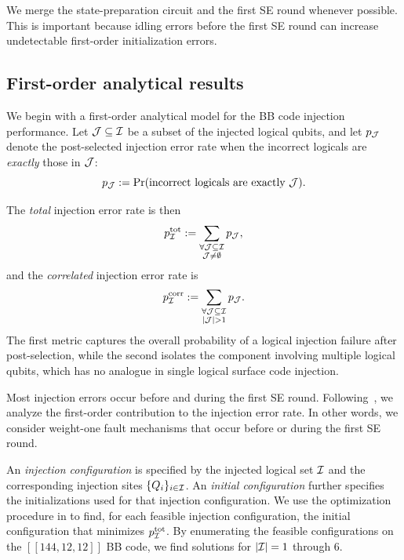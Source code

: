 We merge the state-preparation circuit and the first SE round whenever possible. This is important because idling errors before the first SE round can increase undetectable first-order initialization errors.
    

\subsection{First-order analytical results}
\label{sec:first-order}

We begin with a first-order analytical model for the BB code injection performance. Let $\mathcal{J} \subseteq \mathcal{I}$ be a subset of the injected logical qubits, and let $p_{\mathcal{J}}$ denote the post-selected injection error rate when the incorrect logicals are \emph{exactly} those in $\mathcal{J}$:
\begin{equation}
p_{\mathcal{J}} := \Pr(\text{incorrect logicals are exactly } \mathcal{J}).
\label{eq:p-cJ}
\end{equation}

The \emph{total} injection error rate is then
\begin{equation}
    p_{\mathcal{I}}^{\rm tot} := \sum_{\substack{\forall \mathcal{J} \subseteq \mathcal{I} \\ \mathcal{J} \neq \emptyset}} p_{\mathcal{J}},
    \label{eq:p-cI}
\end{equation}
and the \emph{correlated} injection error rate is
\begin{equation}
    p^{\text{corr}}_{\mathcal{I}} := \sum_{\substack{\forall \mathcal{J} \subseteq \mathcal{I} \\ |\mathcal{J}| > 1}} p_{\mathcal{J}}.
    \label{eq:p-corr-cI}
\end{equation}
The first metric captures the overall probability of a logical injection failure after post-selection, while the second isolates the component involving multiple logical qubits, which has no analogue in single logical surface code injection.

Most injection errors occur before and during the first SE round. Following~\cite{li_magic_2015,lao_magic_2022}, we analyze the first-order contribution to the injection error rate.
In other words, we consider weight-one fault mechanisms that occur before or during the first SE round.

An \emph{injection configuration} is specified by the injected logical set $\mathcal{I}$ and the corresponding injection sites $\{Q_i\}_{i\in\mathcal{I}}$. An \emph{initial configuration} further specifies the initializations used for that injection configuration. We use the optimization procedure in 
to find, for each feasible injection configuration, the initial configuration that minimizes $p_{\mathcal{I}}^{\rm tot}$. By enumerating the feasible configurations on the $[[144,12,12]]$ BB code, we find solutions for $|\mathcal{I}|=1$ through 6.

